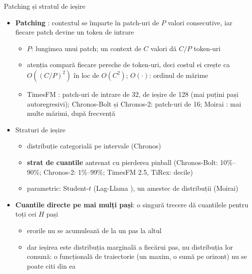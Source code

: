 \begin{frame}{Patching și stratul de ieșire}
\itemsize{\small}
\begin{itemize}
    \item \textbf{Patching} : contextul se împarte în patch-uri de $P$ valori consecutive, iar fiecare patch devine un token de intrare
    \begin{itemize}
        \item $P$: lungimea unui patch; un context de $C$ valori dă $C/P$ token-uri
        \item atenția compară fiecare pereche de token-uri, deci costul ei crește ca $O((C/P)^2)$ în loc de $O(C^2)$; $O(\cdot)$: ordinul de mărime
        \item TimesFM : patch-uri de intrare de 32, de ieșire de 128 (mai puțini pași autoregresivi); Chronos-Bolt și Chronos-2: patch-uri de 16; Moirai : mai multe mărimi, după frecvență
    \end{itemize}
    \item Straturi de ieșire
    \begin{itemize}
        \item distribuție categorială pe intervale (Chronos)
        \item \textbf{strat de cuantile} antrenat cu pierderea pinball (Chronos-Bolt: 10\%--90\%; Chronos-2: 1\%--99\%; TimesFM 2.5, TiRex: decile)
        \item parametric: Student-$t$ (Lag-Llama ), un amestec de distribuții (Moirai)
    \end{itemize}
    \item \textbf{Cuantile directe pe mai mulți pași}: o singură trecere dă cuantilele pentru toți cei $H$ pași
    \begin{itemize}
        \item erorile nu se acumulează de la un pas la altul
        \item dar ieșirea este distribuția marginală a fiecărui pas, nu distribuția lor comună: o funcțională de traiectorie (un maxim, o sumă pe orizont) nu se poate citi din ea
    \end{itemize}
\end{itemize}
\end{frame}

